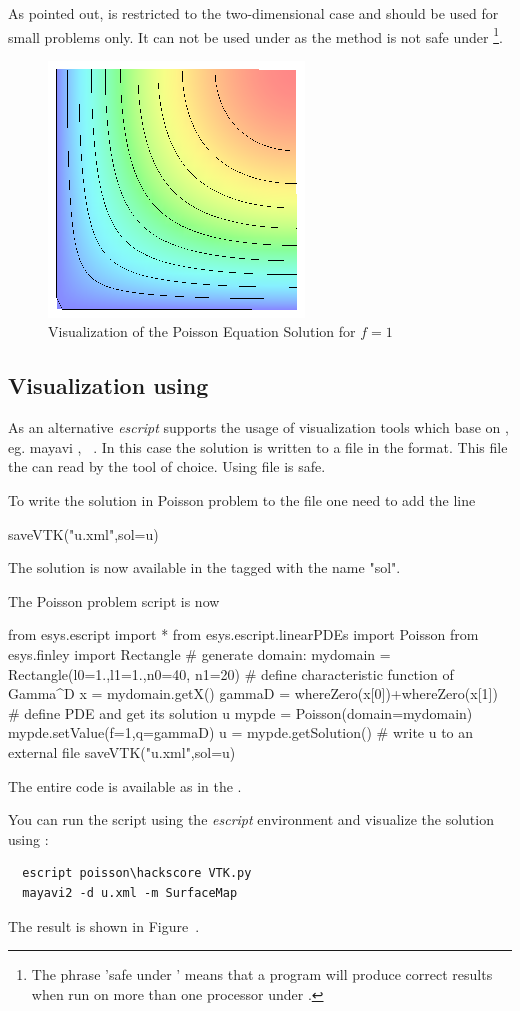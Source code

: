 As pointed out, \MATPLOTLIB is restricted to the two-dimensional case and 
should be used for small problems only. It can not be used under \MPI as the  method is
not safe under \MPI\footnote{The phrase 'safe under \MPI' means that a program will produce correct results when run on more than one processor under \MPI.}.

\begin{figure}
\centerline{\includegraphics[width=\figwidth]{figures/FirstStepResult}}
\caption{Visualization of the Poisson Equation Solution for $f=1$}
\label{fig:FirstSteps.3}
\end{figure}

\subsection{Visualization using \VTK}

As an alternative {\it escript} supports the usage of visualization tools which base on \VTK, eg. mayavi \cite{mayavi}, \VisIt~\cite{VisIt}. In this case the solution is written to a file in the \VTK format. This file the can read by the tool of choice. Using \VTK file is \MPI safe.

To write the solution  in  Poisson problem to the file  one need to add the line
\begin{python}
saveVTK("u.xml",sol=u)
\end{python}
The solution  is now available in the  tagged with the name "sol". 

The Poisson problem script is now 
\begin{python}
  from esys.escript import *
  from esys.escript.linearPDEs import Poisson
  from esys.finley import Rectangle
  # generate domain:
  mydomain = Rectangle(l0=1.,l1=1.,n0=40, n1=20)
  # define characteristic function of Gamma^D
  x = mydomain.getX()
  gammaD = whereZero(x[0])+whereZero(x[1])
  # define PDE and get its solution u
  mypde = Poisson(domain=mydomain)
  mypde.setValue(f=1,q=gammaD)
  u = mypde.getSolution()
  # write u to an external file
  saveVTK("u.xml",sol=u)
\end{python}
The entire code is available as  in the \ExampleDirectory.

You can run the script using the {\it escript} environment
and visualize the solution using \mayavi:
\begin{verbatim}
  escript poisson\hackscore VTK.py
  mayavi2 -d u.xml -m SurfaceMap
\end{verbatim}
The result is shown in Figure~. 
